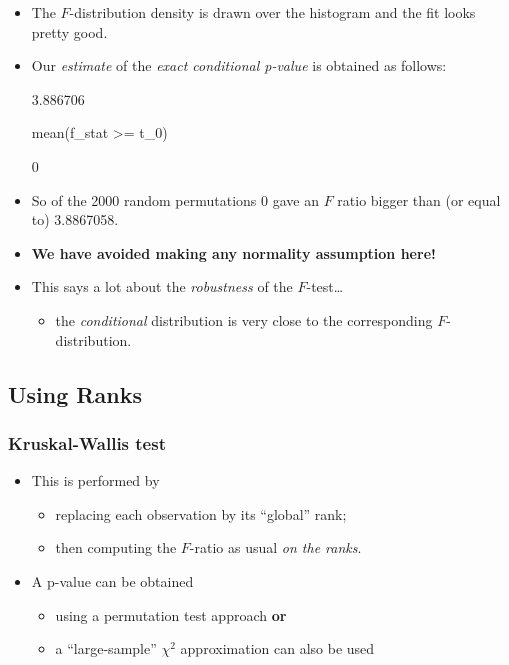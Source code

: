 \documentclass[a4paper]{article}\usepackage[]{graphicx}\usepackage[]{xcolor}
\begin{document}
\begin{itemize}
\begin{Schunk}
\end{Schunk}
	\item The \( F \)-distribution density is drawn over the histogram and the fit looks pretty good.
	\item Our \textit{estimate} of the \textit{exact conditional p-value} is obtained as follows:
\begin{Schunk}
\begin{Soutput}
[1] 3.886706
\end{Soutput}
\begin{Sinput}
mean(f_stat >= t_0)
\end{Sinput}
\begin{Soutput}
[1] 0
\end{Soutput}
\end{Schunk}
	\item So of the 2000 random permutations 0 gave an \( F \) ratio bigger than (or equal to) 3.8867058.
	\item \textbf{We have avoided making any normality assumption here!}
	\item This says a lot about the \textit{robustness} of the \( F \)-test\dots
	\begin{itemize}
		\item the \textit{conditional} distribution is very close to the corresponding \( F \)-distribution.
	\end{itemize}
\end{itemize}
\subsection{Using Ranks}
\subsubsection{Kruskal-Wallis test}
\begin{itemize}
	\item This is performed by
	\begin{itemize}
		\item replacing each observation by its ``global'' rank;
		\item then computing the \( F \)-ratio as usual \textit{on the ranks}.
	\end{itemize}
	\item A p-value can be obtained
	\begin{itemize}
		\item using a permutation test approach \textbf{or}
		\item a ``large-sample'' \( \chi^2 \) approximation can also be used
	\end{itemize}
\end{itemize}
\end{document}
